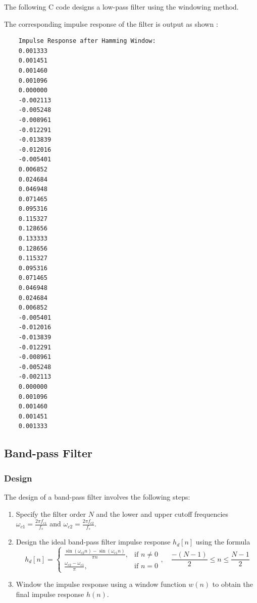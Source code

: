 \documentclass[a4paper,12pt]{article}
\begin{document}
The following C code designs a low-pass filter using the windowing method.



The corresponding impulse response of the filter is output as shown :

\begin{lstlisting}
    Impulse Response after Hamming Window:
    0.001333
    0.001451
    0.001460
    0.001096
    0.000000
    -0.002113
    -0.005248
    -0.008961
    -0.012291
    -0.013839
    -0.012016
    -0.005401
    0.006852
    0.024684
    0.046948
    0.071465
    0.095316
    0.115327
    0.128656
    0.133333
    0.128656
    0.115327
    0.095316
    0.071465
    0.046948
    0.024684
    0.006852
    -0.005401
    -0.012016
    -0.013839
    -0.012291
    -0.008961
    -0.005248
    -0.002113
    0.000000
    0.001096
    0.001460
    0.001451
    0.001333
\end{lstlisting}

\subsection*{Band-pass Filter}

\subsubsection*{Design}
The design of a band-pass filter involves the following steps:
\begin{enumerate}
    \item Specify the filter order $N$ and the lower and upper cutoff
    frequencies $\omega_{c1} = \frac{2\pi f_{c1}}{f_s}$ and
    $\omega_{c2} = \frac{2\pi f_{c2}}{f_s}$.
    \item Design the ideal band-pass filter impulse response $h_d[n]$
    using the formula
    \begin{equation*}
        h_{d}[n] = \begin{cases}
            \frac{\sin(\omega_{c2}n) - \sin(\omega_{c1}n)}{\pi n}, & \text{if } n \neq 0 \\
            \frac{\omega_{c2} - \omega_{c1}}{\pi}, & \text{if } n = 0
        \end{cases}, \quad \frac{-(N-1)}{2} \leq n \leq \frac{N-1}{2}
    \end{equation*}
    \item Window the impulse response using a window function $w(n)$ to
    obtain the final impulse response $h(n)$.
\end{enumerate}
\end{document}
